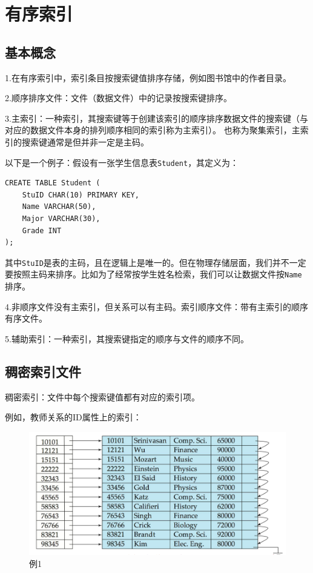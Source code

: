 \section{有序索引}

\subsection{基本概念}

1.在有序索引中，索引条目按搜索键值排序存储，例如图书馆中的作者目录。

2.顺序排序文件：文件（数据文件）中的记录按搜索键排序。

3.主索引：一种索引，其搜索键等于创建该索引的顺序排序数据文件的搜索键（与对应的数据文件本身的排列顺序相同的索引称为主索引）。
也称为聚集索引，主索引的搜索键通常是但并非一定是主码。

以下是一个例子：假设有一张学生信息表\texttt{Student}，其定义为：
\begin{lstlisting}[style=sqlstyle]
CREATE TABLE Student (
    StuID CHAR(10) PRIMARY KEY,
    Name VARCHAR(50),
    Major VARCHAR(30),
    Grade INT
);    
\end{lstlisting}

其中\texttt{StuID}是表的主码，且在逻辑上是唯一的。但在物理存储层面，我们并不一定要按照主码来排序。比如为了经常按学生姓名检索，我们可以让数据文件按\texttt{Name}排序。

4.非顺序文件没有主索引，但关系可以有主码。索引顺序文件：带有主索引的顺序有序文件。

5.辅助索引：一种索引，其搜索键指定的顺序与文件的顺序不同。

\subsection{稠密索引文件}

稠密索引：文件中每个搜索键值都有对应的索引项。

例如，教师关系的ID属性上的索引：

\begin{figure}[H]
    \centering
    \includegraphics[width=0.9\linewidth]{image1.png}
    \caption{例1}
    \label{}
\end{figure}

